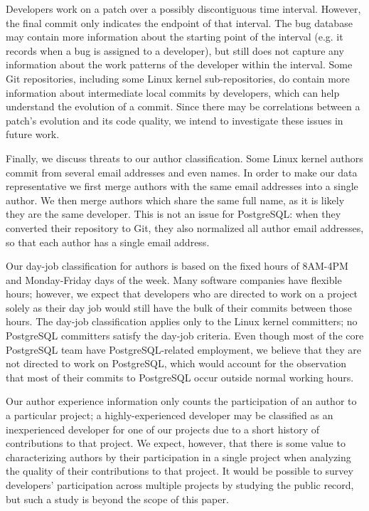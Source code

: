 Developers work on a patch over a possibly discontiguous time interval. However,
the final commit only indicates the endpoint of that interval.  The bug database
may contain more information about the starting point of the interval (e.g. it
records when a bug is assigned to a developer), but still does not capture any
information about the work patterns of the developer within the interval. Some
Git repositories, including some Linux kernel sub-repositories, do contain more
information about intermediate local commits by developers, which can help
understand the evolution of a commit. Since there may be correlations between a
patch's evolution and its code quality, we intend to investigate these issues in
future work.

Finally, we discuss threats to our author classification. Some Linux kernel
authors commit from several email addresses and even names. In order to make our
data representative we first merge authors with the same email addresses into a
single author. We then merge authors which share the same full name, as it is
likely they are the same developer. This is not an issue for PostgreSQL: when
they converted their repository to Git, they also normalized all author email
addresses, so that each author has a single email address.

Our day-job classification for authors is based on the fixed hours of 8AM-4PM
and Monday-Friday days of the week. Many software companies have flexible hours;
however, we expect that developers who are directed to work on a project solely
as their day job would still have the bulk of their commits between those
hours. The day-job classification applies only to the Linux kernel committers;
no PostgreSQL committers satisfy the day-job criteria. Even though most of the
core PostgreSQL team have PostgreSQL-related employment, we believe that they
are not directed to work on PostgreSQL, which would account for the observation
that most of their commits to PostgreSQL occur outside normal working hours.

Our author experience information only counts the participation of an author to
a particular project; a highly-experienced developer may be classified as an
inexperienced developer for one of our projects due to a short history of
contributions to that project. We expect, however, that there is some value to
characterizing authors by their participation in a single project when analyzing
the quality of their contributions to that project. It would be possible to
survey developers' participation across multiple projects by studying the public
record, but such a study is beyond the scope of this paper.
